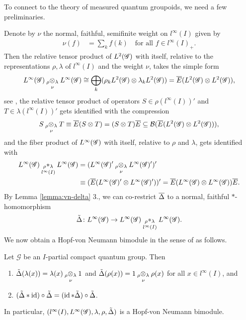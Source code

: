 To connect to the theory of measured quantum groupoids, we need a few
preliminaries.

Denote by $\nu$ the
normal, faithful, semifinite weight on $l^{\infty}(I)$ given by
\begin{align*}
  \nu(f) &=\sum_{k} f(k) \quad \text{for all } f\in l^{\infty}(I)_{+}.
\end{align*}
Then the relative tensor product of $L^{2}(\mathscr{G})$ with itself,
relative to the representations $\rho,\lambda$ of $l^{\infty}(I)$ and
the weight $\nu$, takes the simple form
\begin{align*}
L^{\infty}(\mathscr{G}) \underset{\nu{}}{_{\rho}\otimes_{\lambda}} L^{\infty}(\mathscr{G}) \cong
  \bigoplus_{k} (\rho_{k}L^{2}(\mathscr{G}) \otimes \lambda_{k}L^{2}(\mathscr{G})) =
  \overline{E}(L^{2}(\mathscr{G}) \otimes L^{2}(\mathscr{G})),
\end{align*}
see \cite{},  the relative tensor product
of operators $S\in \rho(l^{\infty}(I))'$ and $T \in
\lambda(l^{\infty}(I))'$ gets identified with the compression
\begin{align*}
S \underset{\nu{}}{_{\rho}\otimes_{\lambda}} T \equiv
  \overline{E}(S \otimes
  T) = (S \otimes T)\overline{E} \subseteq {\cal B}(\overline{E}(L^{2}(\mathscr{G})
  \otimes L^{2}(\mathscr{G}))),
\end{align*}
and the fiber product of  $  L^{\infty}(\mathscr{G})$ with itself, relative to $\rho$
and $\lambda$,  gets identified with
\begin{align} \label{eq:vn-fiber}
  \begin{aligned}
    L^{\infty}(\mathscr{G}) \underset{l^{\infty}(I)}{_{\rho}\ast_{\lambda}} L^{\infty}(\mathscr{G}) &= (L^{\infty}(\mathscr{G})' \underset{\nu{}}{_{\rho}\otimes_{\lambda}} L^{\infty}(\mathscr{G})')' \\ &\equiv
    (\overline{E}(L^{\infty}(\mathscr{G})' \otimes L^{\infty}(\mathscr{G})'))' = \overline{E}(L^{\infty}(\mathscr{G}) \otimes
    L^{\infty}(\mathscr{G}))\overline{E}.
  \end{aligned}
\end{align} 
By Lemma \ref{lemma:vn-delta} 3., we can co-restrict $\overline{\Delta}$ to  a
normal, faithful $*$-homomorphism
\begin{align*}
  \tilde\Delta \colon L^{\infty}(\mathscr{G}) \to   L^{\infty}(\mathscr{G}) \underset{l^{\infty}(I)}{_{\rho}\ast_{\lambda}} L^{\infty}(\mathscr{G}).
\end{align*}
We now obtain a Hopf-von Neumann bimodule in the
sense of \cite{} as follows.
\begin{Prop}
  Let $\mathscr{G}$ be an $I$-partial compact quantum group. Then
  \begin{enumerate}
  \item $\tilde\Delta(\lambda(x)) = \lambda(x) \underset{\nu{}}{_{\rho}\otimes_{\lambda}} 1$ and
    $\tilde\Delta(\rho(x)) = 1 \underset{\nu{}}{_{\rho}\otimes_{\lambda}} \rho(x)$ for all $x\in
    l^{\infty}(I)$, and
  \item $(\tilde\Delta \ast \operatorname{id})\circ \tilde\Delta = (\operatorname{id} \ast \tilde\Delta)
    \circ \tilde\Delta$.
  \end{enumerate}
  In particular, $(l^{\infty}(I),L^{\infty}(\mathscr{G}), \lambda,\rho,\tilde\Delta)$ is a
  Hopf-von Neumann bimodule.
\end{Prop}

